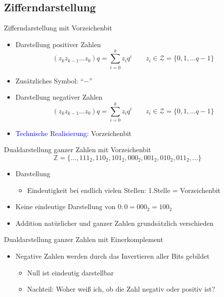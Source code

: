 \documentclass[12pt%
,aspectratio=169%
]{beamer}
\begin{document}
\subsection{Zifferndarstellung}
\begin{frame}{Zifferndarstellung mit Vorzeichenbit}
\begin{itemize}
	\item Darstellung positiver Zahlen
	$$
		(z_k z_{k-1} \ldots z_0)q = \sum_{i = 0}^k z_i q^i \qquad z_i \in \mathcal{Z}= \{0,1, \ldots q-1 \}
	$$
	\item Zusätzliches Symbol: \enquote{$-$}
	\item Darstellung negativer Zahlen
	$$
		(z_k z_{k-1} \ldots z_0)q = \sum_{i = 0}^k z_i q^i \qquad z_i \in \mathcal{Z}= \{0,1, \ldots q-1 \}
	$$
	\item \textcolor{blue}{Technische Realisierung:} Vorzeichenbit
\end{itemize}
\end{frame}

\begin{frame}{Dualdarstellung ganzer Zahlen mit Vorzeichenbit}
$$
	\mathbb{Z} = \{ \ldots , 111_2 , 110_2 , 101_2 , 000_2 , 001_2 , 010_2 , 011_2 , . . . \}
$$
\begin{itemize}
	\item Darstellung
	\begin{itemize}
		\item Eindeutigkeit bei endlich vielen Stellen: 1.Stelle = Vorzeichenbit
	\end{itemize}
	\item Keine eindeutige Darstellung von $0: 0 = 000_2 = 100_2$
	\item Addition natürlicher und ganzer Zahlen grundsätzlich verschieden
\end{itemize}
\end{frame}

\begin{frame}{Dualdarstellung ganzer Zahlen mit Einerkomplement}
\begin{itemize}
	\item Negative Zahlen werden durch das Invertieren aller Bits gebildet
	\begin{itemize}
		\item Null ist eindeutig darstellbar
		\item Nachteil: Woher weiß ich, ob die Zahl negativ oder positiv ist?
	\end{itemize}
\end{itemize}
\end{frame}
\end{document}
